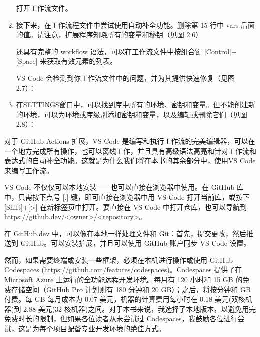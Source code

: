 \begin{enumerate}

打开工作流文件。

\item 
接下来，在工作流程文件中尝试使用自动补全功能。删除第 15 行中 vars 后面的值。请注意，扩展程序知晓所有的变量和秘钥（见图 2.6）


还具有完整的 workflow 语法，可以在工作流文件中按组合键 [Control]+[Space] 来获取有效元素的列表。

VS Code 会检测到你工作流文件中的问题，并为其提供快速修复（见图 2.7）：


\item 
在SETTINGS窗口中，可以找到库中所有的环境、密钥和变量。但不能创建新的环境，可以为环境或库级别添加密钥和变量，以及编辑或删除它们（见图 2.8）：


\end{enumerate}


对于 GitHub Actions 扩展，VS Code 是编写和执行工作流的完美编辑器，可以在一个地方完成所有操作，也可以离线工作，并且具有高级语法高亮和针对工作流和表达式的自动补全功能。这就是为什么我们将在本书的其余部分中，使用VS Code来编写工作流。


VS Code 不仅仅可以本地安装——也可以直接在浏览器中使用。在 GitHub 库中，只需按下点号 [.] 键，即可直接在浏览器中用 VS Code 打开当前库，或按下 [Shift]+[>] 在新标签页中打开。要直接在 VS Code 中打开仓库，也可以导航到https://github.dev/<owner>/<repository>。

在 GitHub.dev 中，可以像在本地一样处理文件和 Git：首先，提交更改，然后推送到 GitHub。可以安装扩展，并且可以使用 GitHub 账户同步 VS Code 设置。

然而，如果需要终端或安装一些框架，必须在本机进行操作或使用 GitHub Codespaces (\url{https://github.com/features/codespaces})。Codespaces 提供了在 Microsoft Azure 上运行的全功能远程开发环境。每月有 120 小时和 15 GB 的免费存储空间（GitHub Pro 计划则有 180 分钟和 20 GB）；之后，将按分钟和 GB 付费。每 GB 每月成本为 0.07 美元，机器的计算费用每小时在 0.18 美元(双核机器)到 2.88 美元(32 核机器)之间。对于本书来说，我选择了本地版本，以避免用完免费时长的限制，但如果各位读者从未尝试过 Codespaces，我鼓励各位进行尝试，这是为每个项目配备专业开发环境的绝佳方式。